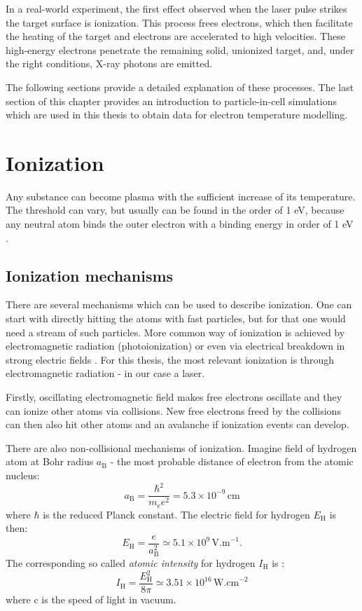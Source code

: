 In a real-world experiment, the first effect observed when the laser pulse strikes the target surface is ionization. This process frees electrons, which then facilitate the heating of the target and electrons are accelerated to high velocities. These high-energy electrons penetrate the remaining solid, unionized target, and, under the right conditions, X-ray photons are emitted.

The following sections provide a detailed explanation of these processes. The last section of this chapter provides an introduction to particle-in-cell simulations which are used in this thesis to obtain data for electron temperature modelling.

\section{Ionization}
Any substance can become plasma with the sufficient increase of its temperature. The threshold can vary, but usually can be found in the order of 1 eV, because any neutral atom binds the outer electron with a binding energy in order of 1 eV \cite{laser-plasma1}. 

\subsection*{Ionization mechanisms}
There are several mechanisms which can be used to describe ionization. One can start with directly hitting the atoms with fast particles, but for that one would need a stream of such particles. More common way of ionization is achieved by electromagnetic radiation (photoionization) or even via electrical breakdown in strong electric fields \cite{plasma-intro}. For this thesis, the most relevant ionization is through electromagnetic radiation - in our case a laser.

Firstly, oscillating electromagnetic field makes free electrons oscillate and they can ionize other atoms via collisions. New free electrons freed by the collisions can then also hit other atoms and an avalanche if ionization events can develop.

There are also non-collisional mechanisms of ionization. Imagine field of hydrogen atom at Bohr radius $a_\mathrm{B}$ - the most probable distance of electron from the atomic nucleus:
\begin{equation}
	a_\mathrm{B} = \frac{\hbar^2}{m_\mathrm{e}e^2} = 5.3 \times 10^{-9} \, \mathrm{ cm}
\end{equation}
\noindent where $\hbar$ is the reduced Planck constant.
The electric field for hydrogen $E_{\mathrm{H}}$ is then:
\begin{equation}
	E_{\mathrm{H}} = \frac{e}{a_\mathrm{B}^2} \simeq 5.1 \times 10^{9} \, \mathrm{V.m}^{-1}.
\end{equation}
\noindent The corresponding so called \textit{atomic intensity} for hydrogen $I_{\mathrm{H}}$ is \cite{plasma-intro}:
\begin{equation}
	I_{\mathrm{H}} = \frac{E_{\mathrm{H}}^2}{8\pi} \simeq 3.51 \times 10^{16} \, \mathrm{W.cm}^{-2}
\end{equation}
\noindent where c is the speed of light in vacuum.

